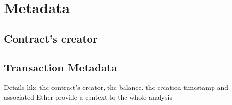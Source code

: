\section{Metadata} \label{sec:static-metadata}

\subsection{Contract's creator}

\subsection{Transaction Metadata}

Details like the contract's creator, the balance, the creation timestamp and associated Ether provide a context to the whole analysis